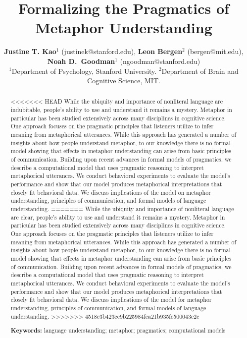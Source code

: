 \documentclass[10pt,letterpaper]{article}
\title{Formalizing the Pragmatics of Metaphor Understanding}
\author{{\large {\bf Justine T. Kao$^1$} (justinek@stanford.edu)}, {\large {\bf Leon Bergen$^2$} (bergen@mit.edu)}, {\large {\bf Noah D.~Goodman$^1$} (ngoodman@stanford.edu)}\\
  $^1$Department of Psychology, Stanford University. $^2$Department of Brain and Cognitive Science, MIT. }
\begin{document}
\maketitle
\begin{abstract}
<<<<<<< HEAD
While the ubiquity and importance of nonliteral language are indubitable, people's ability to use and understand it remains a mystery. Metaphor in particular has been studied extensively across many disciplines in cognitive science. One approach focuses on the pragmatic principles that listeners utilize to infer meaning from metaphorical utterances. While this approach has generated a number of insights about how people understand metaphor, to our knowledge there is no formal model showing that effects in metaphor understanding can arise from basic principles of communication. Building upon recent advances in formal models of pragmatics, we describe a computational model that uses pragmatic reasoning to interpret metaphorical utterances. We conduct behavioral experiments to evaluate the model's performance and show that our model produces metaphorical interpretations that closely fit behavioral data. We discuss implications of the model on metaphor understanding, principles of communication, and formal models of language understanding.
=======
While the ubiquity and importance of nonliteral language are clear, people's ability to use and understand it remains a mystery. Metaphor in particular has been studied extensively across many disciplines in cognitive science. One approach focuses on the pragmatic principles that listeners utilize to infer meaning from metaphorical utterances. While this approach has generated a number of insights about how people understand metaphor, to our knowledge there is no formal model showing that effects in metaphor understanding can arise from basic principles of communication. Building upon recent advances in formal models of pragmatics, we describe a computational model that uses pragmatic reasoning to interpret metaphorical utterances. We conduct behavioral experiments to evaluate the model's performance and show that our model produces metaphorical interpretations that closely fit behavioral data. We discuss implications of the model for metaphor understanding, principles of communication, and formal models of language understanding.
>>>>>>> 4518e3b423cc9b225984fca21b935fe500043e2e

\textbf{Keywords:} 
language understanding; metaphor; pragmatics; computational models
\end{abstract}
\end{document}

